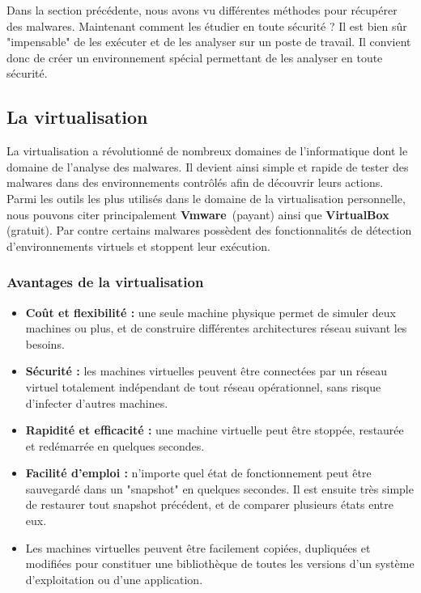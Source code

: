 Dans la section précédente, nous avons vu différentes méthodes pour récupérer des malwares. Maintenant comment les étudier en toute sécurité ? Il est bien sûr "impensable" de les exécuter et de les analyser sur un poste de travail. Il convient donc de créer un environnement spécial permettant de les analyser en toute sécurité.
\subsection{La virtualisation}
La virtualisation a révolutionné de nombreux domaines de l’informatique dont le domaine de l’analyse des malwares. Il devient ainsi simple et rapide de tester des malwares dans des environnements contrôlés afin de découvrir leurs actions.\\

Parmi les outils les plus utilisés dans le domaine de la virtualisation personnelle, nous pouvons citer principalement \textbf{Vmware}~\cite{vm}(payant) ainsi que \textbf{VirtualBox}~\cite{vbox} (gratuit). Par contre certains malwares possèdent des fonctionnalités de détection d'environnements virtuels et stoppent leur exécution.
\subsubsection{Avantages de la virtualisation}
\begin{itemize}
\item \textbf{Coût et flexibilité :} une seule machine physique permet de simuler deux machines ou plus, et de construire différentes
architectures réseau suivant les besoins.
\item \textbf{Sécurité :} les machines virtuelles peuvent être connectées par un réseau virtuel totalement indépendant de tout réseau
opérationnel, sans risque d'infecter d'autres machines.
\item \textbf{Rapidité et efficacité :} une machine virtuelle peut être stoppée, restaurée et redémarrée en quelques secondes.
\item \textbf{Facilité d'emploi :} n'importe quel état de fonctionnement peut être sauvegardé dans un "snapshot" en quelques secondes. Il est ensuite très simple de restaurer tout snapshot précédent, et de comparer plusieurs états entre eux.
\item Les machines virtuelles peuvent être facilement copiées, dupliquées et modifiées pour constituer une bibliothèque de toutes les versions d’un système d’exploitation ou d’une application.
\end{itemize}
